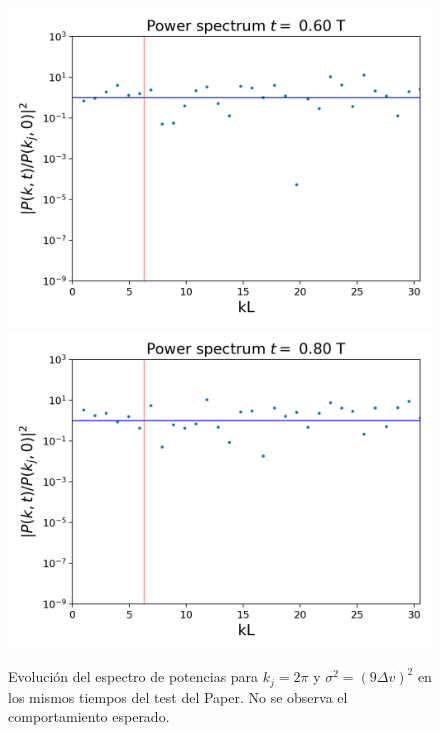 \documentclass[notitlepage,letterpaper,12pt]{article} %
\begin{document}
\begin{figure}[H]
   \includegraphics[scale= 0.5]{2powerSeries24.png}
   \includegraphics[scale= 0.5]{2powerSeries32.png}
  \caption{Evolución del espectro de potencias para $k_j = 2\pi$  y $\sigma^2 = (9\Delta v)^2$ en los mismos tiempos del test del Paper. No se observa el comportamiento esperado. }
  \label{fig: potencias2}
\end{figure}
\end{document}
